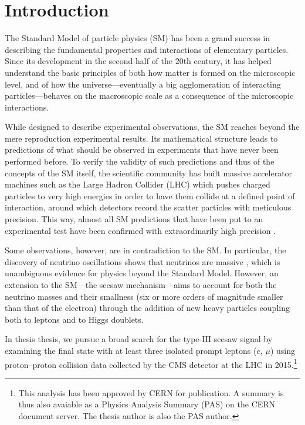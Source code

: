 \chapter{Introduction}
\label{sec:Introduction}

The Standard Model of particle physics (SM) \cite{i2003gauge,aitchison2003gauge,Peskin:257493} has been a grand success in describing the fundamental properties and interactions of elementary particles. Since its development in the second half of the 20th century, it has helped understand the basic principles of both how matter is formed on the microscopic level, and of how the universe\hairspace---\hairspace{}eventually a big agglomeration of interacting particles\hairspace---\hairspace{}behaves on the macroscopic scale as a consequence of the microscopic interactions.

While designed to describe experimental observations, the SM reaches beyond the mere reproduction experimental results. Its mathematical structure leads to predictions of what should be observed in experiments that have never been performed before. To verify the validity of such predictions and thus of the concepts of the SM itself, the scientific community has built massive accelerator machines such as the Large Hadron Collider (LHC) \cite{Evans:2008zzb} which pushes charged particles to very high energies in order to have them collide at a defined point of interaction, around which detectors record the scatter particles with meticulous precision. This way, almost all SM predictions that have been put to an experimental test have been confirmed with extraordinarily high precision \cite{Agashe:2014kda}.

Some observations, however, are in contradiction to the SM. In particular, the discovery of neutrino oscillations shows that neutrinos are massive \cite{Nustatus}, which is unambiguous evidence for physics beyond the Standard Model. However, an extension to the SM\hairspace---\hairspace{}the seesaw mechanism\hairspace---\hairspace{}aims to account for both the neutrino masses and their smallness (six or more orders of magnitude smaller than that of the electron) through the addition of new heavy particles coupling both to leptons and to Higgs doublets.

In thesis thesis, we pursue a broad search for the type-III seesaw signal \cite{SeesawIII:a} by examining the final state with at least three isolated prompt leptons ($e$, $\mu$) using proton--proton collision data collected by the CMS detector \cite{Chatrchyan:2008zzk} at the LHC in 2015.\footnote{This analysis has been approved by CERN for publication. A summary is thus also avaiable as a Physics Analysis Summary (PAS) \cite{CMS-PAS-EXO-16-002} on the CERN document server. The thesis author is also the PAS author.}

